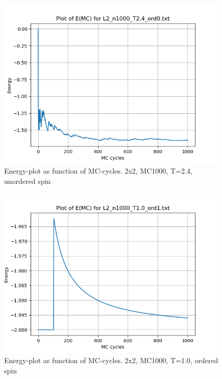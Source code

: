 \documentclass{article}
\begin{document}
\begin{figure}[ht]
    \centering
    \includegraphics[width = 11cm]{img/energy_L2_n1000_T24_ord0.png}
    \caption{Energy-plot as function of MC-cycles. 2x2, MC1000, T=2.4, unordered spin}
    \label{fig:energy_L2_n1000_T2.4_ord0}
  \end{figure}

\begin{figure}[ht]
    \centering
    \includegraphics[width = 11cm]{img/energy_L2_n1000_T10_ord1.png}
    \caption{Energy-plot as function of MC-cycles. 2x2, MC1000, T=1.0, ordered spin}
    \label{fig:energy_L2_n1000_T1.0_ord1}
  \end{figure}
\end{document}
